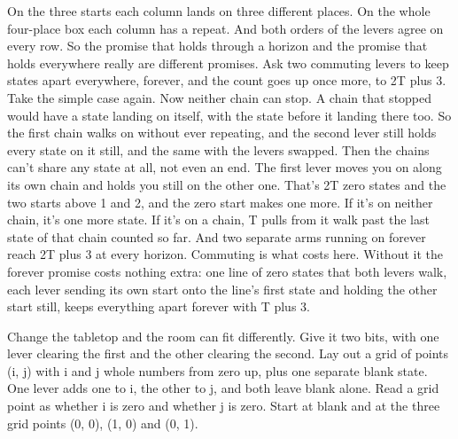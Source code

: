 \documentclass[11pt,twoside]{article}
\theoremstyle{thielethm}
\theoremstyle{thieledef}
\theoremstyle{thieledef}
\theoremstyle{thieledef}
\theoremstyle{thielethm}
\theoremstyle{thieleobs}
\theoremstyle{thielethm}
\begin{document}
On the three starts each column lands on three different places. On the whole four-place box each column has a repeat. And both orders of the levers agree on every row. So the promise that holds through a horizon and the promise that holds everywhere really are different promises. Ask two commuting levers to keep states apart everywhere, forever, and the count goes up once more, to 2T plus 3. Take the simple case again. Now neither chain can stop. A chain that stopped would have a state landing on itself, with the state before it landing there too. So the first chain walks on without ever repeating, and the second lever still holds every state on it still, and the same with the levers swapped. Then the chains can't share any state at all, not even an end. The first lever moves you on along its own chain and holds you still on the other one. That's 2T zero states and the two starts above 1 and 2, and the zero start makes one more. If it's on neither chain, it's one more state. If it's on a chain, T pulls from it walk past the last state of that chain counted so far. And two separate arms running on forever reach 2T plus 3 at every horizon. Commuting is what costs here. Without it the forever promise costs nothing extra: one line of zero states that both levers walk, each lever sending its own start onto the line's first state and holding the other start still, keeps everything apart forever with T plus 3.

Change the tabletop and the room can fit differently. Give it two bits, with one lever clearing the first and the other clearing the second. Lay out a grid of points (i, j) with i and j whole numbers from zero up, plus one separate blank state. One lever adds one to i, the other to j, and both leave blank alone. Read a grid point as whether i is zero and whether j is zero. Start at blank and at the three grid points (0, 0), (1, 0) and (0, 1).

\begin{center}
\end{center}
\end{document}
